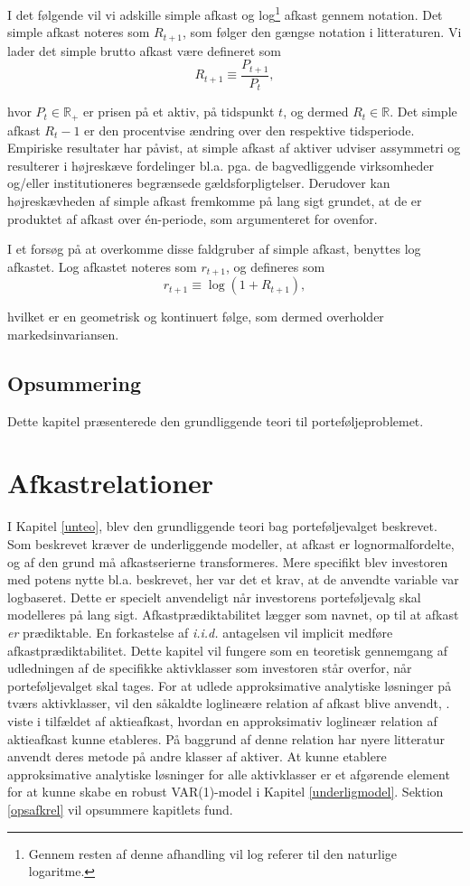 \documentclass[
  a4paper,
  oneside]{memoir}
\begin{document}
I det følgende vil vi adskille simple afkast og log\footnote{Gennem resten af denne afhandling vil log referer til den naturlige logaritme.} afkast gennem notation. Det simple afkast noteres som \(R_{t+1}\), som følger den gængse notation i litteraturen. Vi lader det simple brutto afkast være defineret som
\[R_{t+1}\equiv\frac{P_{t+1}}{P_t},\]

hvor \(P_t\in\mathbb{R}_+\) er prisen på et aktiv, på tidspunkt \(t\), og dermed \(R_t\in\mathbb{R}\). Det simple afkast \(R_t-1\) er den procentvise ændring over den respektive tidsperiode. Empiriske resultater har påvist, at simple afkast af aktiver udviser assymmetri og resulterer i højreskæve fordelinger bl.a. pga. de bagvedliggende virksomheder og/eller institutioneres begrænsede gældsforpligtelser. Derudover kan højreskævheden af simple afkast fremkomme på lang sigt grundet, at de er produktet af afkast over én-periode, som argumenteret for ovenfor.

I et forsøg på at overkomme disse faldgruber af simple afkast, benyttes log afkastet. Log afkastet noteres som \(r_{t+1}\), og defineres som
\[r_{t+1}\equiv\log(1+R_{t+1}),\]

hvilket er en geometrisk og kontinuert følge, som dermed overholder markedsinvariansen.

\hypertarget{opsunteo}{%
\section{Opsummering}\label{opsunteo}}

Dette kapitel præsenterede den grundliggende teori til porteføljeproblemet.

\hypertarget{afkrel}{%
\chapter{Afkastrelationer}\label{afkrel}}

I Kapitel \ref{unteo}, blev den grundliggende teori bag porteføljevalget beskrevet. Som beskrevet kræver de underliggende modeller, at afkast er lognormalfordelte, og af den grund må afkastserierne transformeres. Mere specifikt blev investoren med potens nytte bl.a. beskrevet, her var det et krav, at de anvendte variable var logbaseret. Dette er specielt anvendeligt når investorens porteføljevalg skal modelleres på lang sigt. Afkastprædiktabilitet lægger som navnet, op til at afkast \emph{er} prædiktable. En forkastelse af \emph{i.i.d.} antagelsen vil implicit medføre afkastprædiktabilitet. Dette kapitel vil fungere som en teoretisk gennemgang af udledningen af de specifikke aktivklasser som investoren står overfor, når porteføljevalget skal tages. For at udlede approksimative analytiske løsninger på tværs aktivklasser, vil den såkaldte loglineære relation af afkast blive anvendt, \citep{Campbell1988}. \citep{Campbell1988} viste i tilfældet af aktieafkast, hvordan en approksimativ loglineær relation af aktieafkast kunne etableres. På baggrund af denne relation har nyere litteratur anvendt deres metode på andre klasser af aktiver. At kunne etablere approksimative analytiske løsninger for alle aktivklasser er et afgørende element for at kunne skabe en robust VAR(1)-model i Kapitel \ref{underligmodel}. Sektion \ref{opsafkrel} vil opsummere kapitlets fund.
\end{document}
